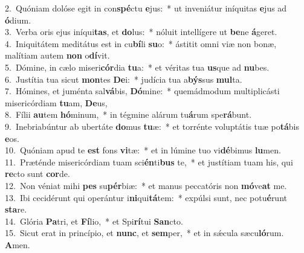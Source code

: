 {2.~}Quóniam dolóse egit in con\textbf{spé}ctu \textbf{e}jus:~* ut inveniátur iníquitas \textbf{e}jus ad \textbf{ó}dium.\\
{3.~}Verba oris ejus iníqui\textbf{tas}, et \textbf{do}lus:~* nóluit intellígere ut \textbf{be}ne \textbf{á}geret.\\
{4.~}Iniquitátem meditátus est in cu\textbf{bí}li \textbf{su}o:~* ástitit omni viæ non bonæ, malítiam autem \textbf{non} o\textbf{dí}vit.\\
{5.~}Dómine, in cælo miseri\textbf{cór}dia \textbf{tu}a:~* et véritas tua \textbf{us}que ad \textbf{nu}bes.\\
{6.~}Justítia tua sicut \textbf{mon}tes \textbf{De}i:~* judícia tua a\textbf{býs}sus \textbf{mul}ta.\\
{7.~}Hómines, et juménta sal\textbf{vá}bis, \textbf{Dó}mine:~* quemádmodum multiplicásti misericórdiam \textbf{tu}am, \textbf{De}us,\\
{8.~}Fílii \textbf{au}tem \textbf{hó}minum,~* in tégmine alárum tu\textbf{á}rum spe\textbf{rá}bunt.\\
{9.~}Inebriabúntur ab ubertáte \textbf{do}mus \textbf{tu}æ:~* et torrénte voluptátis tuæ po\textbf{tá}bis \textbf{e}os.\\
{10.~}Quóniam apud te \textbf{est} fons \textbf{vi}tæ:~* et in lúmine tuo vi\textbf{dé}bimus \textbf{lu}men.\\
{11.~}Præténde misericórdiam tuam sci\textbf{én}ti\textbf{bus} te,~* et justítiam tuam his, qui \textbf{re}cto sunt \textbf{cor}de.\\
{12.~}Non véniat mihi \textbf{pes} su\textbf{pér}biæ:~* et manus peccatóris non \textbf{mó}ve\textbf{at} me.\\
{13.~}Ibi cecidérunt qui operántur i\textbf{ni}qui\textbf{tá}tem:~* expúlsi sunt, nec potu\textbf{é}runt \textbf{sta}re.\\
{14.~}Glória \textbf{Pa}tri, et \textbf{Fí}lio,~* et Spi\textbf{rí}tui \textbf{San}cto.\\
{15.~}Sicut erat in princípio, et \textbf{nunc}, et \textbf{sem}per,~* et in sǽcula sæcu\textbf{ló}rum. \textbf{A}men.\\
